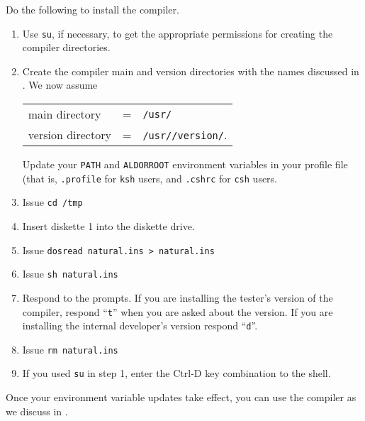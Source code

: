Do the following to install the compiler.
\begin{enumerate}
\item Use {\tt su}, if necessary, to get the appropriate
permissions for creating the compiler directories.
%
\item Create the compiler main and version directories with the
names discussed in .
We now assume

\begin{tabular}{@{\qquad}lcl}
main directory & =  & {\tt /usr/\asharpcmd{}} \\
version directory & = & {\tt /usr/\asharpcmd{}/version/\asharpver{}}.
\end{tabular}

Update your {\tt PATH} and {\tt ALDORROOT} environment variables in
your profile file (that is, {\tt .profile} for {\tt ksh} users,
and {\tt .cshrc} for {\tt csh} users.
%
\item Issue {\tt cd /tmp}
\item Insert diskette 1 into the diskette drive.
\item Issue {\tt dosread natural.ins > natural.ins}
\item Issue {\tt sh natural.ins}
\item Respond to the prompts.
If you are installing the tester's version of the compiler,
respond ``{\tt t}'' when you are asked about the version.
If you are installing the internal developer's version
respond ``{\tt d}''.
\item Issue {\tt rm natural.ins}
\item If you used {\tt su} in step 1,
enter the Ctrl-D key combination to the shell.
\end{enumerate}

Once your environment variable updates take effect, you can use
the compiler as we discuss in .

